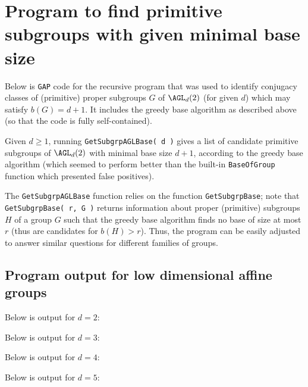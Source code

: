 

\section{Program to find primitive subgroups with given minimal base size}

Below is \texttt{GAP} code for the recursive program that was used to identify conjugacy classes of (primitive) proper subgroups $G$ of $\AGL_d(2)$ (for given $d$) which may satisfy $b(G) = d + 1$. It includes the greedy base algorithm as described above (so that the code is fully self-contained).

Given $d \geq 1$, running \texttt{GetSubgrpAGLBase( d )} gives a list of candidate primitive subgroups of $\AGL_d(2)$ with minimal base size $d + 1$, according to the greedy base algorithm (which seemed to perform better than the built-in \texttt{BaseOfGroup} function which presented false positives).

The \texttt{GetSubgrpAGLBase} function relies on the function \texttt{GetSubgrpBase}; note that \texttt{GetSubgrpBase( r, G )} returns information about proper (primitive) subgroups $H$ of a group $G$ such that the greedy base algorithm finds no base of size at most $r$ (thus are candidates for $b(H) > r$). Thus, the program can be easily adjusted to answer similar questions for different families of groups.\label{app:subgrps_base_len}




% 

\subsection{Program output for low dimensional affine groups}\label{app:agl_output}

Below is output for $d = 2$:



Below is output for $d = 3$:



Below is output for $d = 4$:



Below is output for $d = 5$:


